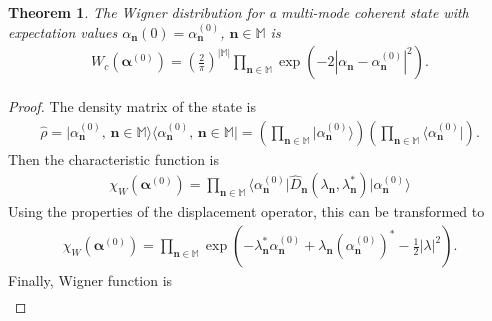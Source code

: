 \documentclass[12pt,aip,jmp,amssymb,amsmath]{revtex4-1}
\newtheorem{theorem}{Theorem}
\begin{document}
\begin{theorem}
    The Wigner distribution for a multi-mode coherent state with expectation values
    $\alpha_{\boldsymbol{n}}(0) = \alpha_{\boldsymbol{n}}^{(0)}$, $\boldsymbol{n} \in \mathbb{M}$ is
    \begin{equation*}\begin{split}
        W_c (\boldsymbol{\alpha}^{(0)})
        = \left( \frac{2}{\pi} \right)^{|\mathbb{M}|} \prod_{\boldsymbol{n} \in \mathbb{M}}
            \exp(-2 |\alpha_{\boldsymbol{n}} - \alpha_{\boldsymbol{n}}^{(0)}|^2).
    \end{split}\end{equation*}
\end{theorem}
\begin{proof}
The density matrix of the state is
\begin{equation}\begin{split}
    \hat{\rho}
    = \vert \alpha_{\boldsymbol{n}}^{(0)},\, \boldsymbol{n} \in \mathbb{M} \rangle
        \langle \alpha_{\boldsymbol{n}}^{(0)},\, \boldsymbol{n} \in \mathbb{M} \vert
    = \left( \prod_{\boldsymbol{n} \in \mathbb{M}} \vert \alpha_{\boldsymbol{n}}^{(0)} \rangle \right)
        \left( \prod_{\boldsymbol{n} \in \mathbb{M}} \langle \alpha_{\boldsymbol{n}}^{(0)} \vert \right).
\end{split}\end{equation}
Then the characteristic function is
\begin{equation}\begin{split}
    \chi_W (\boldsymbol{\alpha}^{(0)})
    = \prod_{\boldsymbol{n} \in \mathbb{M}}
        \langle \alpha_{\boldsymbol{n}}^{(0)} \vert
        \hat{D}_{\boldsymbol{n}} (\lambda_{\boldsymbol{n}}, \lambda_{\boldsymbol{n}}^*)
        \vert \alpha_{\boldsymbol{n}}^{(0)} \rangle
\end{split}\end{equation}
Using the properties of the displacement operator, this can be transformed to
\begin{equation}\begin{split}
    \chi_W (\boldsymbol{\alpha}^{(0)})
    = \prod_{\boldsymbol{n} \in \mathbb{M}}
        \exp(
            - \lambda_{\boldsymbol{n}}^* \alpha_{\boldsymbol{n}}^{(0)}
            + \lambda_{\boldsymbol{n}} (\alpha_{\boldsymbol{n}}^{(0)})^*
            - \frac{1}{2} |\lambda|^2
        ).
\end{split}\end{equation}
Finally, Wigner function is
\begin{equation}\begin{split}

\end{split}
\end{equation}
\end{proof}
\end{document}
